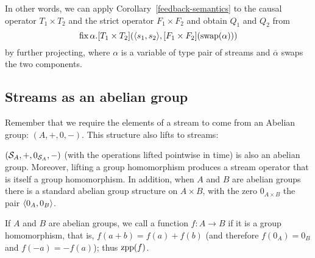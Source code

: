 

In other words, 
we can apply Corollary~\ref{feedback-semantics} to the causal operator $T_1\times T_2$
and the strict operator $F_1\times F_2$ and obtain $Q_1$ and $Q_2$ from
$$
\mbox{fix}\,\alpha.[T_1\times T_2](\langle s_1,s_2 \rangle,[F_1\times F_2](\mbox{swap}(\alpha)))
$$
by further projecting, where $\alpha$ is a variable of type pair of streams and $\overline{\alpha}$
swaps the two components.








\subsection{Streams as an abelian group}\label{sec:abelianstreams}

Remember that we require the elements of a stream to come from an Abelian group:
$(A,+,0,-)$.  This structure also lifts to streams:

\begin{proposition}
$(\mathcal{S}_{A},+,0_{\mathcal{S}_{A}},-)$ (with the operations lifted pointwise in time) 
is also an abelian group. Moreover, lifting a group homomorphism produces
a stream operator that is itself a group homomorphism.
In addition, when $A$ and $B$ are abelian groups there is a standard abelian group structure
on $A\times B$, with the zero $0_{A \times B}$ the pair $\langle 0_A,0_B \rangle$.
\end{proposition}


\begin{definition}[linear]
If $A$ and $B$ are abelian groups, we call
a function $f: A \rightarrow B$  if it is a group homomorphism, that is,
$f(a+b)=f(a)+f(b)$ (and therefore $f(0_A)=0_B$ and $f(-a)=-f(a)$); thus $\mbox{zpp}(f)$.
\end{definition}

